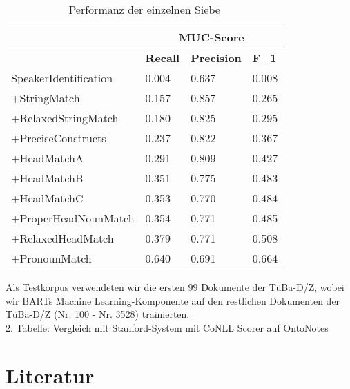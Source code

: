 \documentclass{scrartcl}
\begin{document}
\begin{table}[h]
\begin{tabular}{l||ll|l}
& \multicolumn{3}{c}{\textbf{MUC-Score}} \\ \hline
	                 & \textbf{Recall} & \textbf{Precision} & \textbf{F\_1} \\ \hline
SpeakerIdentification & 0.004  & 0.637     & 0.008    \\ 
+StringMatch          & 0.157  & 0.857     & 0.265    \\ 
+RelaxedStringMatch   & 0.180  & 0.825     & 0.295    \\ 
+PreciseConstructs    & 0.237  & 0.822     & 0.367    \\ 
+HeadMatchA           & 0.291  & 0.809     & 0.427    \\ 
+HeadMatchB           & 0.351  & 0.775     & 0.483    \\ 
+HeadMatchC           & 0.353  & 0.770     & 0.484    \\ 
+ProperHeadNounMatch  & 0.354  & 0.771     & 0.485    \\ 
+RelaxedHeadMatch     & 0.379  & 0.771     & 0.508    \\ 
+PronounMatch         & 0.640  & 0.691     & 0.664    \\ 

\end{tabular}
\caption{Performanz der einzelnen Siebe}
\end{table}
Als Testkorpus verwendeten wir die ersten 99 Dokumente der TüBa-D/Z, wobei wir BARTs Machine Learning-Komponente auf den restlichen Dokumenten der TüBa-D/Z (Nr. 100 - Nr. 3528) trainierten.\\
2. Tabelle: Vergleich mit Stanford-System mit CoNLL Scorer auf OntoNotes\\


\clearpage

\nocite{*}
\renewcommand*{\refname}{} %
\section{Literatur}  
{}

\end{document}

